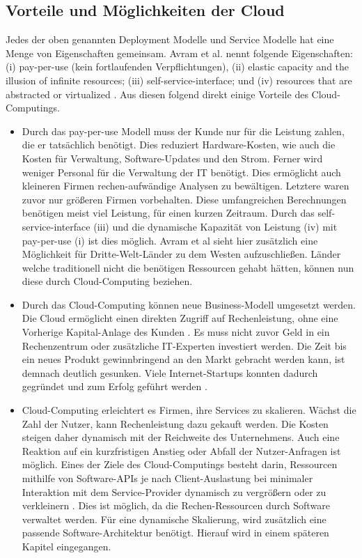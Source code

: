 \subsection{Vorteile und Möglichkeiten der Cloud}
Jedes der oben genannten Deployment Modelle und Service Modelle hat eine Menge von Eigenschaften gemeinsam. Avram et al. nennt folgende Eigenschaften: (i) pay-per-use (kein fortlaufenden Verpflichtungen), (ii) elastic capacity and the illusion of infinite resources; (iii) self-service-interface; und (iv) resources that are abstracted or virtualized \cite{avram_advantages_2014}. Aus diesen folgend direkt einige Vorteile des Cloud-Computings.
\begin{itemize}
  \item Durch das pay-per-use Modell muss der Kunde nur für die Leistung zahlen, die er tatsächlich benötigt. Dies reduziert Hardware-Kosten, wie auch die Kosten für Verwaltung, Software-Updates und den Strom. Ferner wird weniger Personal für die Verwaltung der IT benötigt. Dies ermöglicht auch kleineren Firmen rechen-aufwändige Analysen zu bewältigen. Letztere waren zuvor nur größeren Firmen vorbehalten. Diese umfangreichen Berechnungen benötigen meist viel Leistung, für einen kurzen Zeitraum. Durch das self-service-interface (iii) und die dynamische Kapazität von Leistung (iv) mit pay-per-use (i) ist dies möglich. Avram et al \cite{avram_advantages_2014} sieht hier zusätzlich eine Möglichkeit für Dritte-Welt-Länder zu dem Westen aufzuschließen. Länder welche traditionell nicht die benötigen Ressourcen gehabt hätten, können nun diese durch Cloud-Computing beziehen.  
  \item Durch das Cloud-Computing können neue Business-Modell umgesetzt werden. Die Cloud ermöglicht einen direkten Zugriff auf Rechenleistung, ohne eine Vorherige Kapital-Anlage des Kunden \cite{noauthor_premise_2020}. Es muss nicht zuvor Geld in ein Rechenzentrum oder zusätzliche IT-Experten investiert werden. Die Zeit bis ein neues Produkt gewinnbringend an den Markt gebracht werden kann, ist demnach deutlich gesunken. Viele Internet-Startups konnten dadurch gegründet und zum Erfolg geführt werden \cite{avram_advantages_2014}. 
  \item Cloud-Computing erleichtert es Firmen, ihre Services zu skalieren. Wächst die Zahl der Nutzer, kann Rechenleistung dazu gekauft werden. Die Kosten steigen daher dynamisch mit der Reichweite des Unternehmens. Auch eine Reaktion auf ein kurzfristigen Anstieg oder Abfall der Nutzer-Anfragen ist möglich. Eines der Ziele des Cloud-Computings besteht darin, Ressourcen mithilfe von Software-APIs je nach Client-Auslastung bei minimaler Interaktion mit dem Service-Provider dynamisch zu vergrößern oder zu verkleinern \cite{avram_advantages_2014}. Dies ist möglich, da die Rechen-Ressourcen durch Software verwaltet werden. Für eine dynamische Skalierung, wird zusätzlich eine passende Software-Architektur benötigt. Hierauf wird in einem späteren Kapitel eingegangen.

\end{itemize}

